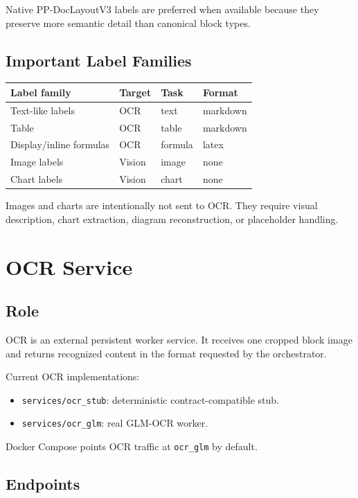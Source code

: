 \documentclass[11pt,a4paper]{article}
\begin{document}
Native PP-DocLayoutV3 labels are preferred when available because they preserve
more semantic detail than canonical block types.

\subsection{Important Label Families}

\begin{longtable}{p{4cm}p{3cm}p{3cm}p{3cm}}
\toprule
Label family & Target & Task & Format \\
\midrule
Text-like labels & OCR & text & markdown \\
Table & OCR & table & markdown \\
Display/inline formulas & OCR & formula & latex \\
Image labels & Vision & image & none \\
Chart labels & Vision & chart & none \\
\bottomrule
\end{longtable}

Images and charts are intentionally not sent to OCR. They require visual
description, chart extraction, diagram reconstruction, or placeholder handling.

\section{OCR Service}

\subsection{Role}

OCR is an external persistent worker service. It receives one cropped block
image and returns recognized content in the format requested by the
orchestrator.

Current OCR implementations:

\begin{itemize}[leftmargin=1.2cm]
\item \texttt{services/ocr\_stub}: deterministic contract-compatible stub.
\item \texttt{services/ocr\_glm}: real GLM-OCR worker.
\end{itemize}

Docker Compose points OCR traffic at \texttt{ocr\_glm} by default.

\subsection{Endpoints}
\end{document}
